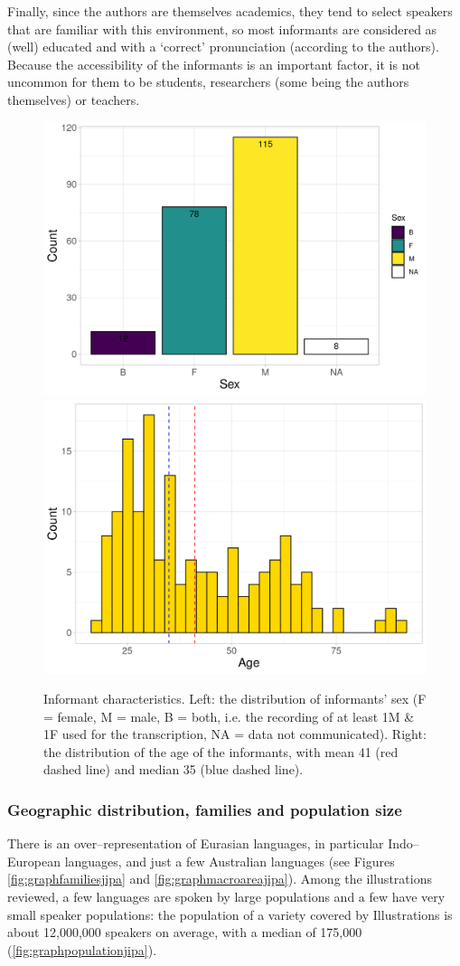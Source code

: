 Finally, since the authors are themselves academics, they tend to select speakers that are familiar with this environment, so most informants are considered as (well) educated and with a ‘correct’ pronunciation (according to the authors). Because the accessibility of the informants is an important factor, it is not uncommon for them to be students, researchers (some being the authors themselves) or teachers.

\begin{figure}
	\centering
	\includegraphics[width=0.475\linewidth]{jipa/images/graph_informant_JIPA}
	\includegraphics[width=0.475\linewidth]{jipa/images/graph_age_JIPA}
	\caption[Informant characteristics of the \textit{Illustrations of the IPA}]{Informant characteristics. Left: the distribution of informants' sex (F = female, M = male, B = both, i.e. the recording of at least 1M \& 1F used for the transcription, NA = data not communicated). Right: the distribution of the age of the informants, with mean 41 (red dashed line) and median 35 (blue dashed line).}
	\label{fig:graphagejipa}
\end{figure}


\subsubsection{Geographic distribution, families and population size}

There is an over–representation of Eurasian languages, in particular Indo–European languages, and just a few Australian languages (see Figures \ref{fig:graphfamiliesjipa} and \ref{fig:graphmacroareajipa}). Among the illustrations reviewed, a few languages are spoken by large populations and a few have very small speaker populations: the population of a variety covered by Illustrations is about 12,000,000 speakers on average, with a median of 175,000 (\autoref{fig:graphpopulationjipa}).

